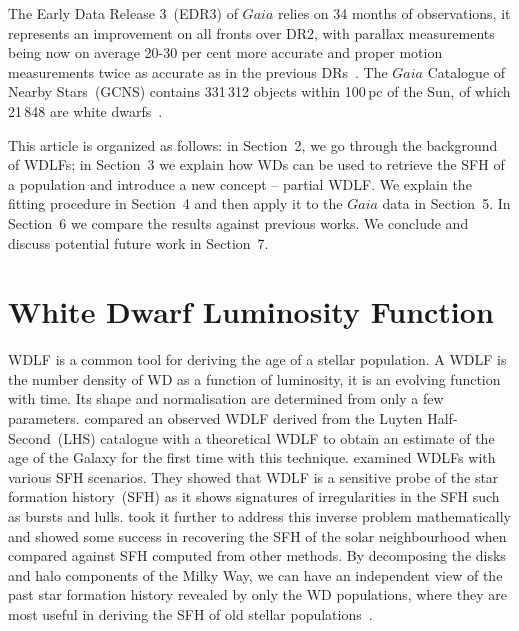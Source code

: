 \documentclass[fleqn,usenatbib]{mnras}
\begin{document}
The Early Data Release 3~(EDR3) of $Gaia$ relies on 34 months of observations, it
represents an improvement on all fronts over DR2, with parallax measurements
being now on average 20-30 per cent more accurate and proper motion measurements
twice as accurate as in the previous
DRs~\citep{2021A&A...649A...1G, 2021A&A...649A...2L}. The $Gaia$ Catalogue of
Nearby Stars~(GCNS) contains 331\,312 objects within 100\,pc of the Sun, of
which 21\,848 are white dwarfs~\citep{2021A&A...649A...6G}.

This article is organized as follows: in Section~2, we go through the background
of WDLFs; in Section~3 we explain how WDs can be used to retrieve the SFH of a
population and introduce a new concept -- partial WDLF. We explain the fitting
procedure in Section~4 and then apply it to the $Gaia$ data in Section~5. In
Section~6 we compare the results against previous works. We conclude and discuss
potential future work in Section~7.

\section{White Dwarf Luminosity Function}
WDLF is a common tool for deriving the age of a stellar population. A WDLF is
the number density of WD as a function of luminosity, it is an evolving
function with time. Its shape and normalisation are determined from only a few
parameters. \citet{1987ApJ...315L..77W} compared an observed WDLF derived from
the Luyten Half-Second~(LHS) catalogue with a theoretical WDLF to obtain an
estimate of the age of the Galaxy for the first time with this technique.
\citet{1990ApJ...352..605N} examined WDLFs with various SFH scenarios. They
showed that WDLF is a sensitive probe of the star formation history~(SFH) as
it shows signatures of irregularities in the SFH such as bursts and lulls.
\citet{2013MNRAS.434.1549R} took it further to address this inverse problem
mathematically and showed some success in recovering the SFH of the solar
neighbourhood when compared against SFH computed from other methods. By
decomposing the disks and halo components of the Milky Way, we can have an
independent view of the past star formation history revealed by only the
WD populations, where they are most useful in deriving the SFH of old
stellar populations~\citep{2011MNRAS.417...93R, 2017ASPC..509...25L}.
\end{document}
